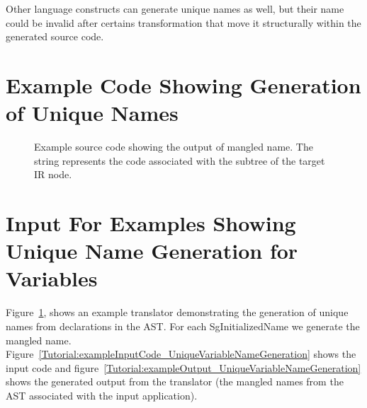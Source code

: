 Other language constructs can generate unique names as well, but their
name could be invalid after certains transformation that move it 
structurally within the generated source code.


\section{Example Code Showing Generation of Unique Names}

\begin{figure}[!h]
{\indent
{\mySmallFontSize

\begin{latexonly}
   
\end{latexonly}

\begin{htmlonly}
   
\end{htmlonly}

}
}
\caption{Example source code showing the output of mangled name. The string
         represents the code associated with the subtree of the target IR node.}
\label{Tutorial:uniqueNameGeneration}
\end{figure}


\section{Input For Examples Showing Unique Name Generation for Variables}

Figure~\ref{Tutorial:uniqueNameGeneration},
shows an example translator demonstrating the generation of unique names from 
declarations in the AST.  For each SgInitializedName we generate the
mangled name.  Figure~\ref{Tutorial:exampleInputCode_UniqueVariableNameGeneration} 
shows the input code and 
figure~\ref{Tutorial:exampleOutput_UniqueVariableNameGeneration}
shows the generated output from the translator (the mangled names from
the AST associated with the input application).

